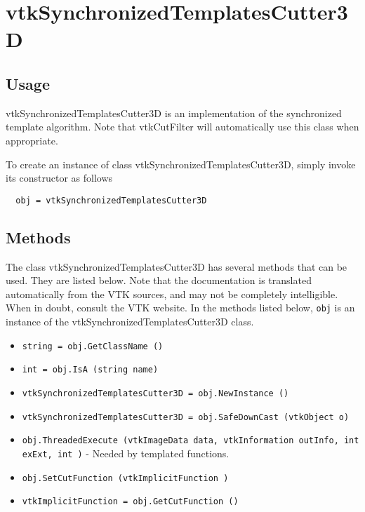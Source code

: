 \section{vtkSynchronizedTemplatesCutter3D}

\subsection{Usage}

 vtkSynchronizedTemplatesCutter3D is an implementation of the synchronized 
 template algorithm. Note that vtkCutFilter will automatically
 use this class when appropriate.

To create an instance of class vtkSynchronizedTemplatesCutter3D, simply
invoke its constructor as follows
\begin{verbatim}
  obj = vtkSynchronizedTemplatesCutter3D
\end{verbatim}
\subsection{Methods}

The class vtkSynchronizedTemplatesCutter3D has several methods that can be used.
  They are listed below.
Note that the documentation is translated automatically from the VTK sources,
and may not be completely intelligible.  When in doubt, consult the VTK website.
In the methods listed below, \verb|obj| is an instance of the vtkSynchronizedTemplatesCutter3D class.
\begin{itemize}
\item  \verb|string = obj.GetClassName ()|

\item  \verb|int = obj.IsA (string name)|

\item  \verb|vtkSynchronizedTemplatesCutter3D = obj.NewInstance ()|

\item  \verb|vtkSynchronizedTemplatesCutter3D = obj.SafeDownCast (vtkObject o)|

\item  \verb|obj.ThreadedExecute (vtkImageData data, vtkInformation outInfo, int exExt, int )| -  Needed by templated functions.

\item  \verb|obj.SetCutFunction (vtkImplicitFunction )|

\item  \verb|vtkImplicitFunction = obj.GetCutFunction ()|

\end{itemize}
